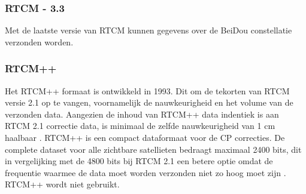 \subsubsection{RTCM - 3.3}
Met de laatste versie van RTCM kunnen gegevens over de BeiDou constellatie verzonden worden. 

\subsubsection{RTCM++}
Het RTCM++ formaat is ontwikkeld in 1993. Dit om de tekorten van RTCM versie 2.1 op te vangen, voornamelijk de nauwkeurigheid en het volume van de verzonden data. Aangezien de inhoud van RTCM++ data indentiek is aan RTCM 2.1 correctie data, is minimaal de zelfde nauwkeurigheid van 1 cm haalbaar \cite{LBibRTCM3}. RTCM++ is een compact dataformaat voor de CP correcties. De complete dataset voor alle zichtbare satellieten bedraagt maximaal 2400 bits, dit in vergelijking met de 4800 bits bij RTCM 2.1 een betere optie omdat de frequentie waarmee de data moet worden verzonden niet zo hoog moet zijn \cite{LBibRTCM4}. RTCM++ wordt niet gebruikt. 

